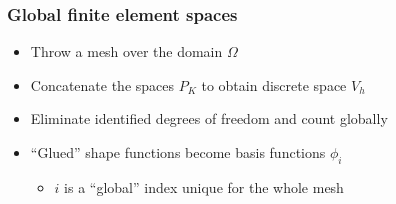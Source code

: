 \begin{frame}
\begin{center}
  \end{center}
\end{frame}

\begin{frame}
  \frametitle{Global finite element spaces}
  \begin{itemize}
  \item Throw a mesh over the domain $\Omega$
  \item Concatenate the spaces $P_K$ to obtain discrete space $V_h$
  \item Eliminate identified degrees of freedom and count globally
  \item ``Glued'' shape functions become basis functions $\phi_i$
    \begin{itemize}
    \item $i$ is a ``global'' index unique for the whole mesh
    \end{itemize}
  \end{itemize}
\end{frame}


